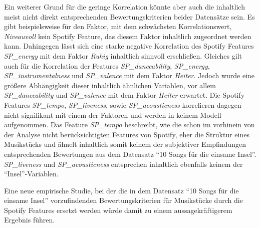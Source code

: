 Ein weiterer Grund für die geringe Korrelation könnte aber auch die inhaltlich meist nicht direkt entsprechenden Bewertungskriterien beider Datensätze sein.
Es gibt beispielsweise für den Faktor, mit dem schwächsten Korrelationswert, \textit{Niveauvoll} kein Spotify Feature, das diesem Faktor inhaltlich zugeordnet werden kann.
Dahingegen lässt sich eine starke negative Korrelation des Spotify Features \textit{SP\_energy} mit dem Faktor \textit{Ruhig} inhaltlich sinnvoll erschließen.
Gleiches gilt auch für die Korrelation der Features \textit{SP\_danceability}, \textit{SP\_energy}, \textit{SP\_instrumentalness} und \textit{SP\_valence} mit dem Faktor \textit{Heiter}.
Jedoch wurde eine größere Abhängigkeit dieser inhaltlich ähnlichen Variablen, vor allem \textit{SP\_danceability} und \textit{SP\_valence} mit dem Faktor \textit{Heiter} erwartet.
Die Spotify Features \textit{SP\_tempo}, \textit{SP\_liveness}, sowie \textit{SP\_acousticness} korrelieren dagegen nicht signifikant mit einem der Faktoren und werden in keinem Modell aufgenommen. 
Das Feature \textit{SP\_tempo} beschreibt, wie die schon im vorhinein von der Analyse nicht berücksichtigten Features von Spotify, eher die Struktur eines Musikstücks und ähnelt inhaltlich somit keinem der subjektiver Empfindungen entsprechenden Bewertungen aus dem Datensatz "`10 Songs für die einsame Insel"'.
\textit{SP\_liveness} und \textit{SP\_acousticness} entsprechen inhaltlich ebenfalls keinem der "`Insel"'-Variablen.  

Eine neue empirische Studie, bei der die in dem Datensatz "`10 Songs für die einsame Insel"' vorzufindenden Bewertungskriterien für Musikstücke durch die Spotify Features ersetzt werden würde damit zu einem aussagekräftigerem Ergebnis führen.



